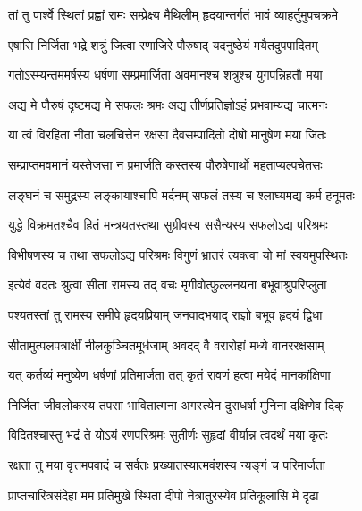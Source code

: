 
\twolineshloka
{तां तु पार्श्वे स्थितां प्रह्वां रामः सम्प्रेक्ष्य मैथिलीम्}
{हृदयान्तर्गतं भावं व्याहर्तुमुपचक्रमे} %

\twolineshloka
{एषासि निर्जिता भद्रे शत्रुं जित्वा रणाजिरे}
{पौरुषाद् यदनुष्ठेयं मयैतदुपपादितम्} %

\twolineshloka
{गतोऽस्म्यन्तममर्षस्य धर्षणा सम्प्रमार्जिता}
{अवमानश्च शत्रुश्च युगपन्निहतौ मया} %

\twolineshloka
{अद्य मे पौरुषं दृष्टमद्य मे सफलः श्रमः}
{अद्य तीर्णप्रतिज्ञोऽहं प्रभवाम्यद्य चात्मनः} %

\twolineshloka
{या त्वं विरहिता नीता चलचित्तेन रक्षसा}
{दैवसम्पादितो दोषो मानुषेण मया जितः} %

\twolineshloka
{सम्प्राप्तमवमानं यस्तेजसा न प्रमार्जति}
{कस्तस्य पौरुषेणार्थो महताप्यल्पचेतसः} %

\twolineshloka
{लङ्घनं च समुद्रस्य लङ्कायाश्चापि मर्दनम्}
{सफलं तस्य च श्लाघ्यमद्य कर्म हनूमतः} %

\twolineshloka
{युद्धे विक्रमतश्चैव हितं मन्त्रयतस्तथा}
{सुग्रीवस्य ससैन्यस्य सफलोऽद्य परिश्रमः} %

\twolineshloka
{विभीषणस्य च तथा सफलोऽद्य परिश्रमः}
{विगुणं भ्रातरं त्यक्त्वा यो मां स्वयमुपस्थितः} %

\twolineshloka
{इत्येवं वदतः श्रुत्वा सीता रामस्य तद् वचः}
{मृगीवोत्फुल्लनयना बभूवाश्रुपरिप्लुता} %

\twolineshloka
{पश्यतस्तां तु रामस्य समीपे हृदयप्रियाम्}
{जनवादभयाद् राज्ञो बभूव हृदयं द्विधा} %

\twolineshloka
{सीतामुत्पलपत्राक्षीं नीलकुञ्चितमूर्धजाम्}
{अवदद् वै वरारोहां मध्ये वानररक्षसाम्} %

\twolineshloka
{यत् कर्तव्यं मनुष्येण धर्षणां प्रतिमार्जता}
{तत् कृतं रावणं हत्वा मयेदं मानकांक्षिणा} %

\twolineshloka
{निर्जिता जीवलोकस्य तपसा भावितात्मना}
{अगस्त्येन दुराधर्षा मुनिना दक्षिणेव दिक्} %

\twolineshloka
{विदितश्चास्तु भद्रं ते योऽयं रणपरिश्रमः}
{सुतीर्णः सुहृदां वीर्यान्न त्वदर्थं मया कृतः} %

\twolineshloka
{रक्षता तु मया वृत्तमपवादं च सर्वतः}
{प्रख्यातस्यात्मवंशस्य न्यङ्गं च परिमार्जता} %

\twolineshloka
{प्राप्तचारित्रसंदेहा मम प्रतिमुखे स्थिता}
{दीपो नेत्रातुरस्येव प्रतिकूलासि मे दृढा} %

